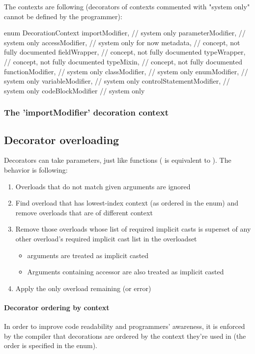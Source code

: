 The contexts are following (decorators of contexts commented with "system only" cannot be defined by the programmer):
\begin{code}
enum DecorationContext {
	importModifier, // system only
	parameterModifier, // system only
	accessModifier, // system only for now
	metadata, // concept, not fully documented
	fieldWrapper, // concept, not fully documented
	typeWrapper, // concept, not fully documented
	typeMixin, // concept, not fully documented
	functionModifier, // system only
	classModifier, // system only
	enumModifier, // system only
	variableModifier, // system only
	controlStatementModifier, // system only
	codeBlockModifier // system only
}
\end{code} \label{enum:DecorationContext}

\subsubsection{The 'importModifier' decoration context}

\subsection{Decorator overloading}
Decorators can take parameters, just like functions ( is equivalent to ). The behavior is following:
\begin{enumerate}
	\item Overloads that do not match given arguments are ignored
	\item Find overload that has lowest-index context (as ordered in the  enum) and remove overloads that are of different context
	\item Remove those overloads whose list of required implicit casts is superset of any other overload's required implicit cast list in the overloadset
	\begin{itemize}
		\item {} arguments are treated as implicit casted
		\item Arguments containing  accessor are also treated as implicit casted
	\end{itemize}
	\item Apply the only overload remaining (or error)
\end{enumerate}

\paragraph{Decorator ordering by context} In order to improve code readability and programmers' awareness, it is enforced by the compiler that decorations are ordered by the context they're used in (the order is specified in the  enum).

